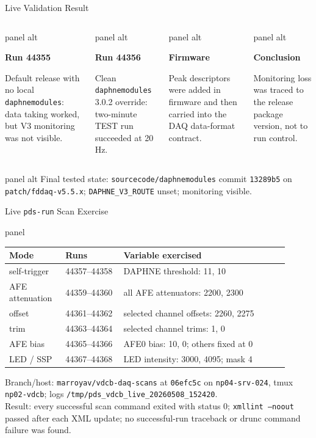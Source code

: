 \documentclass[aspectratio=169,10pt]{beamer}
\newcommand{\statcard}[2]{%
  \begin{beamercolorbox}[wd=\linewidth,sep=6pt,rounded=true]{panel alt}
    {\color{noircyan}\bfseries\fontsize{14}{16}\selectfont #1\par}
    \vspace{0.6mm}
    {\color{noirmuted}\scriptsize #2\par}
  \end{beamercolorbox}
}
\begin{document}
\begin{frame}[t]{Live Validation Result}
\begin{columns}[T,onlytextwidth]
\statcard{Run 44355}{Default release with no local \texttt{daphnemodules}: data taking worked, but V3 monitoring was not visible.}
\statcard{Run 44356}{Clean \texttt{daphnemodules} 3.0.2 override: two-minute TEST run succeeded at 20 Hz.}
\statcard{Firmware}{Peak descriptors were added in firmware and then carried into the DAQ data-format contract.}
\statcard{Conclusion}{Monitoring loss was traced to the release package version, not to run control.}
\end{columns}

\vspace{3mm}
\begin{beamercolorbox}[wd=\linewidth,sep=6pt,rounded=true]{panel alt}
\footnotesize
Final tested state: \texttt{sourcecode/daphnemodules} commit \texttt{13289b5} on \texttt{patch/fddaq-v5.5.x}; \texttt{DAPHNE\_V3\_ROUTE} unset; monitoring visible.
\end{beamercolorbox}
\end{frame}

\begin{frame}[t]{Live \texttt{pds-run} Scan Exercise}
\begin{beamercolorbox}[wd=\linewidth,sep=3pt,rounded=true]{panel}
\tiny
\setlength{\tabcolsep}{3pt}
\renewcommand{\arraystretch}{0.98}
\begin{tabular}{@{}p{0.18\linewidth}p{0.19\linewidth}p{0.54\linewidth}@{}}
\toprule
\textbf{Mode} & \textbf{Runs} & \textbf{Variable exercised} \\
\midrule
self-trigger & 44357--44358 & DAPHNE threshold: 11, 10 \\
AFE attenuation & 44359--44360 & all AFE attenuators: 2200, 2300 \\
offset & 44361--44362 & selected channel offsets: 2260, 2275 \\
trim & 44363--44364 & selected channel trims: 1, 0 \\
AFE bias & 44365--44366 & AFE0 bias: 10, 0; others fixed at 0 \\
LED / SSP & 44367--44368 & LED intensity: 3000, 4095; mask 4 \\
\bottomrule
\end{tabular}
\end{beamercolorbox}

\vspace{1mm}
{\color{noirmuted}\scriptsize
Branch/host: \texttt{marroyav/vdcb-daq-scans} at \texttt{06efc5c} on \texttt{np04-srv-024}, tmux \texttt{np02-vdcb}; logs \texttt{/tmp/pds\_vdcb\_live\_20260508\_152420}.\\[-0.2mm]
Result: every successful scan command exited with status 0; \texttt{xmllint --noout} passed after each XML update; no successful-run traceback or drunc command failure was found.\par}
\end{frame}
\end{document}
